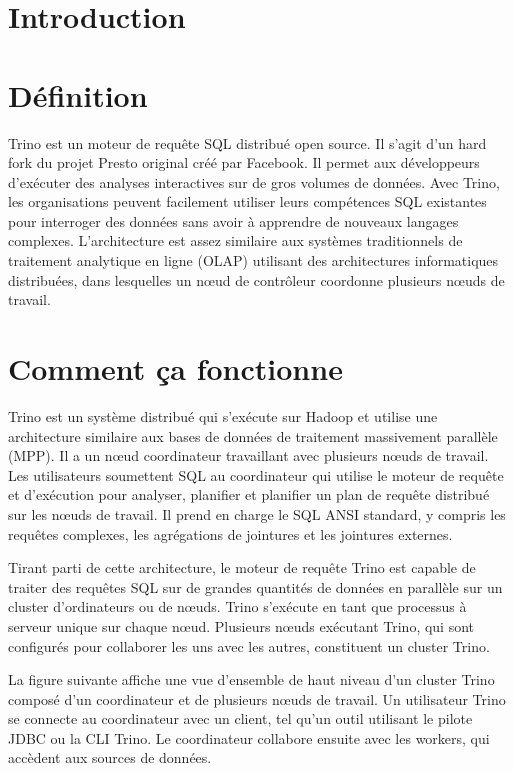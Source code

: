 
\section*{Introduction}

\section{Définition}
Trino est un moteur de requête SQL distribué open source. Il s'agit d'un hard fork du projet Presto original créé par Facebook. Il permet aux développeurs d'exécuter des analyses interactives sur de gros volumes de données. Avec Trino, les organisations peuvent facilement utiliser leurs compétences SQL existantes pour interroger des données sans avoir à apprendre de nouveaux langages complexes. L'architecture est assez similaire aux systèmes traditionnels de traitement analytique en ligne (OLAP) utilisant des architectures informatiques distribuées, dans lesquelles un nœud de contrôleur coordonne plusieurs nœuds de travail.
\section{Comment ça fonctionne}
Trino est un système distribué qui s'exécute sur Hadoop et utilise une architecture similaire aux bases de données de traitement massivement parallèle (MPP). Il a un nœud coordinateur travaillant avec plusieurs nœuds de travail. Les utilisateurs soumettent SQL au coordinateur qui utilise le moteur de requête et d'exécution pour analyser, planifier et planifier un plan de requête distribué sur les nœuds de travail. Il prend en charge le SQL ANSI standard, y compris les requêtes complexes, les agrégations de jointures et les jointures externes.

Tirant parti de cette architecture, le moteur de requête Trino est capable de traiter des requêtes SQL sur de grandes quantités de données en parallèle sur un cluster d'ordinateurs ou de nœuds. Trino s'exécute en tant que processus à serveur unique sur chaque nœud. Plusieurs nœuds exécutant Trino, qui sont configurés pour collaborer les uns avec les autres, constituent un cluster Trino.

La figure suivante affiche une vue d'ensemble de haut niveau d'un cluster Trino composé d'un coordinateur et de plusieurs nœuds de travail. Un utilisateur Trino se connecte au coordinateur avec un client, tel qu'un outil utilisant le pilote JDBC ou la CLI Trino. Le coordinateur collabore ensuite avec les workers, qui accèdent aux sources de données.

